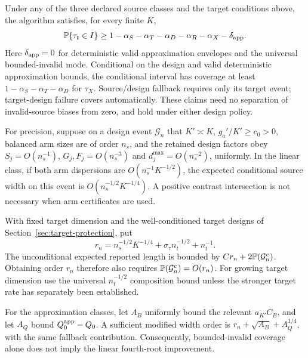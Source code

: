\begin{theorem}
\label{thm:main}
Under any of the three declared source classes and the target conditions
above, the algorithm satisfies, for every finite $K$,
\[
 \mathbb P\{\tau_t\in I\}\ge
 1-\alpha_S-\alpha_T-\alpha_D-\alpha_R-\alpha_X-\delta_{\rm app}.
\]
Here $\delta_{\rm app}=0$ for deterministic valid approximation envelopes
and the universal bounded-invalid mode. Conditional on the design and valid
deterministic approximation bounds, the conditional interval has coverage at
least $1-\alpha_S-\alpha_T-\alpha_D$ for $\tau_X$. Source/design fallback
requires only its target event; target-design failure covers automatically.
These claims need no separation of invalid-source biases from zero, and hold
under either design policy.

For precision, suppose on a design event $\mathcal G_n$ that $K'\asymp K$,
$g_a'/K'\ge c_0>0$, balanced arm sizes are of order $n_s$, and the retained
design factors obey $S_j=O(n_s^{-1})$, $G_j,F_j=O(n_s^{-3})$ and
$d_j^{\max}=O(n_s^{-2})$, uniformly. In the linear class, if both arm
dispersions are $O(n_s^{-1}K^{-1/2})$, the expected conditional source width
on this event is $O(n_s^{-1/2}K^{-1/4})$. A positive contrast intersection
is not necessary when arm certificates are used.

With fixed target dimension and the well-conditioned target designs of
Section~\ref{sec:target-protection}, put
\[
 r_n=n_s^{-1/2}K^{-1/4}
       +\sigma_\tau n_t^{-1/2}+n_t^{-1}.
\]
The unconditional expected reported length is bounded by
$C r_n+2\mathbb P(\mathcal G_n^c)$. Obtaining order $r_n$ therefore also requires
$\mathbb P(\mathcal G_n^c)=O(r_n)$. For growing target dimension use the universal
$n_t^{-1/2}$ composition bound unless the stronger target rate has separately
been established.

For the approximation classes, let $A_B$ uniformly bound the relevant
$a_{K'}C_B$, and let $A_Q$ bound $Q_0^{\rm app}-Q_0$. A sufficient modified
width order is $r_n+\sqrt{A_B}+A_Q^{1/4}$, with the same fallback contribution.
Consequently, bounded-invalid coverage alone does not imply the linear
fourth-root improvement.
\end{theorem}

